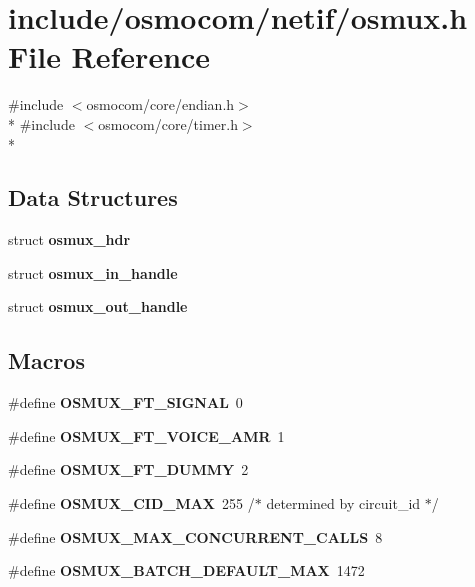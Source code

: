 \section{include/osmocom/netif/osmux.h File Reference}
\label{osmux_8h}
{\ttfamily \#include $<$osmocom/core/endian.\+h$>$}\\*
{\ttfamily \#include $<$osmocom/core/timer.\+h$>$}\\*
\subsection*{Data Structures}
\begin{DoxyCompactItemize}
\item 
struct {\bf osmux\+\_\+hdr}
\item 
struct {\bf osmux\+\_\+in\+\_\+handle}
\item 
struct {\bf osmux\+\_\+out\+\_\+handle}
\end{DoxyCompactItemize}
\subsection*{Macros}
\begin{DoxyCompactItemize}
\item 
\#define {\bfseries O\+S\+M\+U\+X\+\_\+\+F\+T\+\_\+\+S\+I\+G\+N\+AL}~0
\item 
\#define {\bfseries O\+S\+M\+U\+X\+\_\+\+F\+T\+\_\+\+V\+O\+I\+C\+E\+\_\+\+A\+MR}~1
\item 
\#define {\bfseries O\+S\+M\+U\+X\+\_\+\+F\+T\+\_\+\+D\+U\+M\+MY}~2
\item 
\#define {\bfseries O\+S\+M\+U\+X\+\_\+\+C\+I\+D\+\_\+\+M\+AX}~255	/$\ast$ determined by circuit\+\_\+id $\ast$/\label{osmux_8h_aa2b0cfe6dad6635ea3313fd5009332cd}

\item 
\#define {\bfseries O\+S\+M\+U\+X\+\_\+\+M\+A\+X\+\_\+\+C\+O\+N\+C\+U\+R\+R\+E\+N\+T\+\_\+\+C\+A\+L\+LS}~8
\item 
\#define {\bfseries O\+S\+M\+U\+X\+\_\+\+B\+A\+T\+C\+H\+\_\+\+D\+E\+F\+A\+U\+L\+T\+\_\+\+M\+AX}~1472
\end{DoxyCompactItemize}
